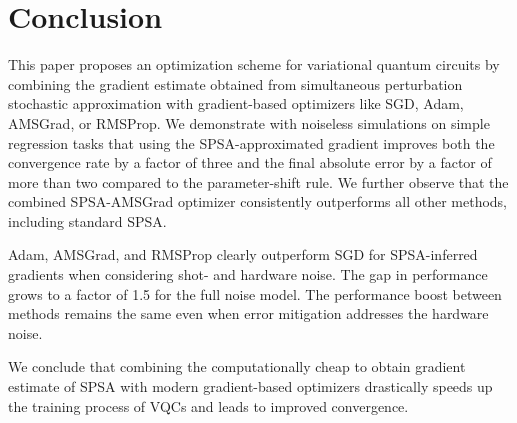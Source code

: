 \section{Conclusion}

This paper proposes an optimization scheme for variational quantum circuits by combining the gradient estimate obtained from simultaneous perturbation stochastic approximation with gradient-based optimizers like SGD, Adam, AMSGrad, or RMSProp. We demonstrate with noiseless simulations on simple regression tasks that using the SPSA-approximated gradient improves both the convergence rate by a factor of three and the final absolute error by a factor of more than two compared to the parameter-shift rule. We further observe that the combined SPSA-AMSGrad optimizer consistently outperforms all other methods, including standard SPSA.

Adam, AMSGrad, and RMSProp clearly outperform SGD for SPSA-inferred gradients when considering shot- and hardware noise. The gap in performance grows to a factor of 1.5 for the full noise model. The performance boost between methods remains the same even when error mitigation addresses the hardware noise.

We conclude that combining the computationally cheap to obtain gradient estimate of SPSA with modern gradient-based optimizers drastically speeds up the training process of VQCs and leads to improved convergence.

